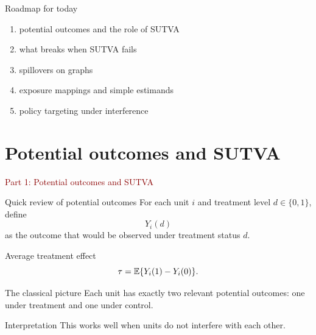 \documentclass[dvipsnames,aspectratio=169,handout]{beamer}
\begin{document}
\begin{frame}{Roadmap for today}
\begin{enumerate}
    \item potential outcomes and the role of SUTVA
    \item what breaks when SUTVA fails
    \item spillovers on graphs
    \item exposure mappings and simple estimands
    \item policy targeting under interference
\end{enumerate}
\end{frame}


\section{Potential outcomes and SUTVA}

\begin{frame}{}
\begin{center}
{\Huge \textcolor{DarkRed}{Part 1: Potential outcomes and SUTVA}}
\end{center}
\end{frame}

\begin{frame}{Quick review of potential outcomes}
For each unit $i$ and treatment level $d\in\{0,1\}$, define
\[
Y_i(d)
\]
as the outcome that would be observed under treatment status $d$.

\begin{block}{Average treatment effect}
\[
\tau = \mathbb{E}\{Y_i(1)-Y_i(0)\}.
\]
\end{block}

\begin{alertblock}{The classical picture}
Each unit has exactly two relevant potential outcomes:
one under treatment and one under control.
\end{alertblock}

\begin{block}{Interpretation}
This works well when units do not interfere with each other.
\end{block}
\end{frame}
\end{document}
